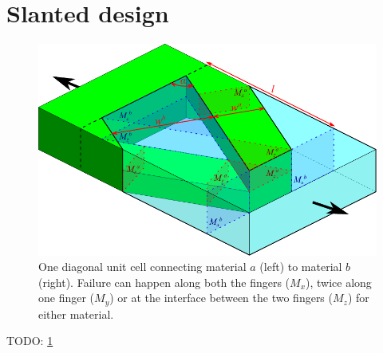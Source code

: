 \section{Slanted design}

\begin{figure}
	\centering
	\includegraphics[width=\columnwidth]{sources/method/diagonal_model_v3.pdf}
	\caption{
		One diagonal unit cell connecting material $a$ (left) to material $b$ (right).
		Failure can happen along both the fingers ($M_x$), twice along one finger ($M_y$) or at the interface between the two fingers ($M_z$) for either material.}
	\label{fig:diagonal_model}
\end{figure}

TODO: \cref{fig:diagonal_model}
